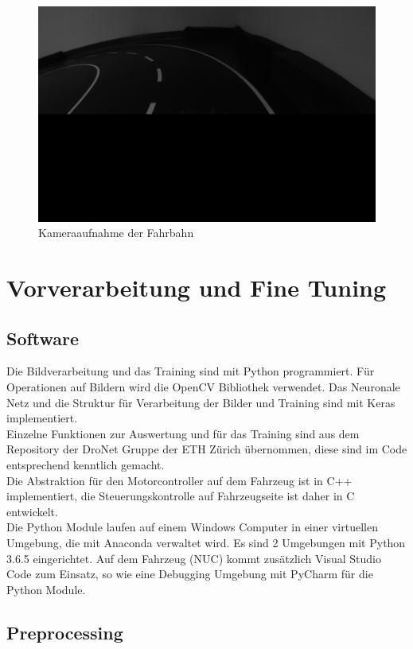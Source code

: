 \begin{figure}[h]
	\centering
	\includegraphics[scale=0.4]{figures/Rohbild.png}
	\caption{Kameraaufnahme der Fahrbahn}
	\label{img:rohbild}
\end{figure}


\section{Vorverarbeitung und Fine Tuning}

\subsection{Software}
Die Bildverarbeitung und das Training sind mit Python programmiert. Für Operationen auf Bildern wird die OpenCV Bibliothek verwendet. Das Neuronale Netz und die Struktur für Verarbeitung der Bilder und Training sind mit Keras implementiert.\\
Einzelne Funktionen zur Auswertung und für das Training sind aus dem Repository der DroNet Gruppe der ETH Zürich übernommen, diese sind im Code entsprechend kenntlich gemacht.\\
Die Abstraktion für den Motorcontroller auf dem Fahrzeug ist in C++ implementiert, die Steuerungskontrolle auf Fahrzeugseite ist daher in C entwickelt.\\
Die Python Module laufen auf einem Windows Computer in einer virtuellen Umgebung, die mit Anaconda verwaltet wird. Es sind 2 Umgebungen mit Python 3.6.5 eingerichtet. Auf dem Fahrzeug (NUC) kommt zusätzlich Visual Studio Code zum Einsatz, so wie eine Debugging Umgebung mit PyCharm für die Python Module.

\subsection{Preprocessing}

